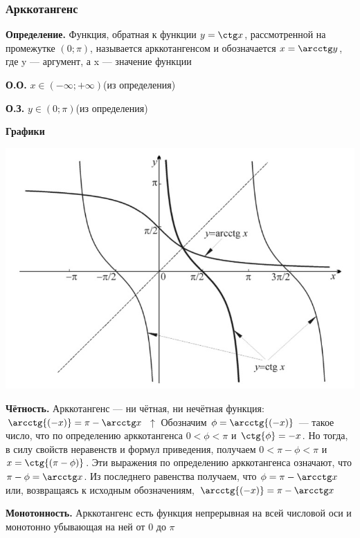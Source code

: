 \documentclass{article}
\begin{document}
        \subsubsection{Арккотангенс}
        
        \textbf{Определение.} Функция, обратная к функции \(y = \ctg x\), рассмотренной на промежутке \((0; \pi)\), называется арккотангенсом и обозначается \(x = \arcctg y\), где y --- аргумент, а x --- значение функции
        
        \textbf{О.О.} \(x \in (-\infty; +\infty)\)(из определения)
        
        \textbf{О.З.} \(y \in (0; \pi)\)(из определения)
        
        \textbf{Графики}
        \begin{center}
            \includegraphics[scale=0.4]{7}
        \end{center}
        
        \textbf{Чётность.} Арккотангенс --- ни чётная, ни нечётная функция: \(\arcctg{(-x)} = \pi - \arcctg x\)
        \(\uparrow\) Обозначим \(\phi = \arcctg{(-x)}\) --- такое число, что по определению арккотангенса \(0 < \phi < \pi\) и \(\ctg{\phi} = -x\). Но тогда, в силу свойств неравенств и формул приведения, получаем
        \(0 < \pi-\phi < \pi\) и \(x = \ctg{(\pi - \phi)}\). Эти выражения по определению арккотангенса означают, что \(\pi-\phi = \arcctg x\).
        Из последнего равенства получаем, что \(\phi = \pi-\arcctg x\) или, возвращаясь к исходным обозначениям, \(\arcctg{(-x)} = \pi - \arcctg x\)
        
        \textbf{Монотонность.} Арккотангенс есть функция непрерывная на всей числовой оси и монотонно убывающая на ней от \(0\) до \(\pi\)
    
\end{document}
